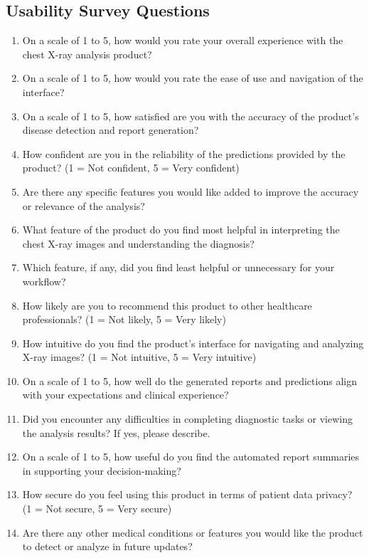 \documentclass[12pt, titlepage]{article}
\begin{document}
\begin{enumerate}
\subsection{Usability Survey Questions}

\begin{enumerate}
  \item On a scale of 1 to 5, how would you rate your overall experience with the chest X-ray analysis product?
  \item On a scale of 1 to 5, how would you rate the ease of use and navigation of the interface?
  \item On a scale of 1 to 5, how satisfied are you with the accuracy of the product's disease detection and report generation?
  \item How confident are you in the reliability of the predictions provided by the product? (1 = Not confident, 5 = Very confident)
  \item Are there any specific features you would like added to improve the accuracy or relevance of the analysis?
  \item What feature of the product do you find most helpful in interpreting the chest X-ray images and understanding the diagnosis?
  \item Which feature, if any, did you find least helpful or unnecessary for your workflow?
  \item How likely are you to recommend this product to other healthcare professionals? (1 = Not likely, 5 = Very likely)
  \item How intuitive do you find the product's interface for navigating and analyzing X-ray images? (1 = Not intuitive, 5 = Very intuitive)
  \item On a scale of 1 to 5, how well do the generated reports and predictions align with your expectations and clinical experience?
  \item Did you encounter any difficulties in completing diagnostic tasks or viewing the analysis results? If yes, please describe.
  \item On a scale of 1 to 5, how useful do you find the automated report summaries in supporting your decision-making?
  \item How secure do you feel using this product in terms of patient data privacy? (1 = Not secure, 5 = Very secure)
  \item Are there any other medical conditions or features you would like the product to detect or analyze in future updates?
\end{enumerate}





\end{enumerate}
\end{document}

